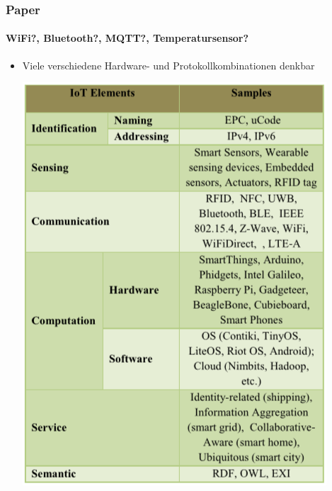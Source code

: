 \documentclass{beamer}
\begin{document}
\begin{frame}

\frametitle{Paper}
\framesubtitle{WiFi?, Bluetooth?, MQTT?, Temperatursensor?}
\begin{itemize}
	\item Viele verschiedene Hardware- und Protokollkombinationen denkbar \begin{center}
		\includegraphics[scale=0.45]{images/iot_element.png}
	\end{center}
\end{itemize}

\end{frame}
\end{document}
